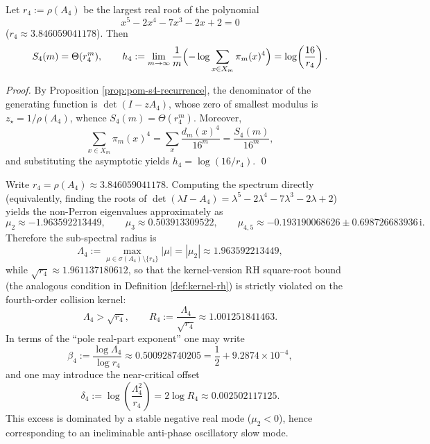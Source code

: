 \begin{corollary}\label{cor:pom-s4-asymptotic}
Let \(r_4:=\rho(A_4)\) be the largest real root of the polynomial
$$
x^5-2x^4-7x^3-2x+2=0
$$
(\(r_4\approx 3.846059041178\)). Then
$$
S_4(m)=\Theta(r_4^m),
\qquad
h_4:=\lim_{m\to\infty}\frac{1}{m}\Bigl(-\log\sum_{x\in X_m}\pi_m(x)^4\Bigr)
=\log\!\left(\frac{16}{r_4}\right).
$$
\end{corollary}
\begin{proof}
By Proposition \ref{prop:pom-s4-recurrence}, the denominator of the generating function is \(\det(I-zA_4)\), whose zero of smallest modulus is \(z_\star=1/\rho(A_4)\), whence \(S_4(m)=\Theta(r_4^m)\). Moreover,
$$
\sum_{x\in X_m}\pi_m(x)^4=\sum_x\frac{d_m(x)^4}{16^m}=\frac{S_4(m)}{16^m},
$$
and substituting the asymptotic yields \(h_4=\log(16/r_4)\). \qed
\end{proof}


\begin{remark}\label{rem:pom-collision-rh-break-a4-spectrum}
Write \(r_4=\rho(A_4)\approx 3.846059041178\).
Computing the spectrum directly (equivalently, finding the roots of \(\det(\lambda I-A_4)=\lambda^5-2\lambda^4-7\lambda^3-2\lambda+2\)) yields the non-Perron eigenvalues approximately as
\[
\mu_2\approx -1.963592213449,\qquad
\mu_3\approx 0.503913309522,\qquad
\mu_{4,5}\approx -0.193190068626\pm 0.698726683936\,\mathrm{i}.
\]
Therefore the sub-spectral radius is
\[
\Lambda_4:=\max_{\mu\in\sigma(A_4)\setminus\{r_4\}}|\mu|
=|\mu_2|
\approx 1.963592213449,
\]
while
\(
\sqrt{r_4}\approx 1.961137180612
\), so that the kernel-version RH square-root bound (the analogous condition in Definition \ref{def:kernel-rh}) is strictly violated on the fourth-order collision kernel:
\[
\Lambda_4>\sqrt{r_4},\qquad
R_4:=\frac{\Lambda_4}{\sqrt{r_4}}\approx 1.001251841463.
\]
In terms of the ``pole real-part exponent'' one may write
\[
\beta_4:=\frac{\log \Lambda_4}{\log r_4}\approx 0.500928740205=\frac12+9.2874\times 10^{-4},
\]
and one may introduce the near-critical offset
\[
\delta_4:=\log\!\left(\frac{\Lambda_4^2}{r_4}\right)=2\log R_4\approx 0.002502117125.
\]
 This excess is dominated by a stable negative real mode (\(\mu_2<0\)), hence corresponding to an ineliminable anti-phase oscillatory slow mode.
\end{remark}

